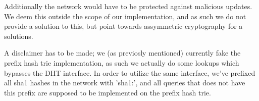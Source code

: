 Additionally the network would have to be protected against malicious updates.
We deem this outside the scope of our implementation, and as such we do not
provide a solution to this, but point towards assymmetric cryptography for a 
solutions.

A disclaimer has to be made; we (as previosly mentioned) currently fake the 
prefix hash trie implementation, as such we actually do some lookups which
bypasses the \acs{DHT} interface. In order to utilize the same interface, we've
prefixed all sha1 hashes in the network with 'sha1:', and all queries that does
not have this prefix are supposed to be implemented on the prefix hash trie.
